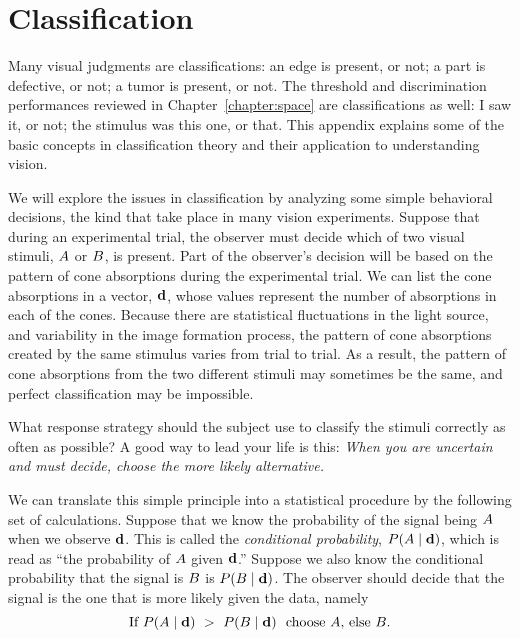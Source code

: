 
\chapter{Classification}
\label{chapter:classification}
Many visual judgments are classifications: an edge is present, or not;
a part is defective, or not; a tumor is present, or not.  The
threshold and discrimination performances reviewed in
Chapter~\ref{chapter:space} are classifications as well: I saw it, or
not; the stimulus was this one, or that.  This appendix explains some
of the basic concepts in classification theory and their application
to understanding vision.

We will explore the issues in classification by analyzing some simple
behavioral decisions, the kind that take place in many vision
experiments.  Suppose that during an experimental trial, the observer
must decide which of two visual stimuli, $\mbox{$A$}$ or $\mbox{$B$}$, is
present.  Part of the observer's decision will be based on the pattern
of cone absorptions during the experimental trial.  We can list the
cone absorptions in a vector, $\mbox{${\bf d}$}$, whose values represent the
number of absorptions in each of the cones.  Because there are
statistical fluctuations in the light source, and variability in the
image formation process, the pattern of cone absorptions created by
the same stimulus varies from trial to trial.  As a result, the
pattern of cone absorptions from the two different stimuli may
sometimes be the same, and perfect classification may be impossible.

What response strategy should the subject use to classify the stimuli
correctly as often as possible?  A good way to lead your life is this:
{\em When you are uncertain and must decide, choose the more likely
alternative.}

We can translate this simple principle into a statistical procedure by
the following set of calculations.  Suppose that we know the
probability of the signal being $\mbox{$A$}$ when we observe $\mbox{${\bf d}$}$.
This is called the {\em conditional probability}, $P(\mbox{$A$} \mid
\mbox{${\bf d}$})$, which is read as ``the probability of $\mbox{$A$}$ given
$\mbox{${\bf d}$}$.''  Suppose we also know the conditional probability that the
signal is $\mbox{$B$}$ is $P(\mbox{$B$} \mid \mbox{${\bf d}$})$.  The observer should
decide that the signal is the one that is more likely given the data,
namely
\begin{equation}
\label{ea3:ml}
\mbox{If}~ P(\mbox{$A$} \mid \mbox{${\bf d}$}) ~ > ~ P(\mbox{$B$} \mid \mbox{${\bf d}$} )  
        \mbox{~~choose \mbox{$A$},  else \mbox{$B$}}.
\end{equation}

